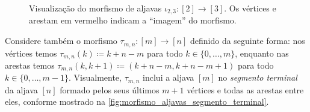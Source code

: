 \begin{figure}[h]
    \centering
    \caption{Visualização do morfismo de aljavas $\iota_{2,3}: [2] \to [3]$. Os vértices e arestam em vermelho indicam a ``imagem'' do morfismo.}
    \label{fig:morfismo_aljavas_segmento_inicial}
\end{figure}

Considere também o morfismo $\tau_{m,n}: [m] \to [n]$ definido da seguinte forma: nos vértices temos $\tau_{m,n}(k) \coloneqq k+n-m$ para todo $k \in \{0,\dots,m\}$, enquanto nas arestas temos $\tau_{m,n}(k,k+1) \coloneqq (k+n-m,k+n-m+1)$ para todo $k \in \{0,\dots,m-1\}$.
Visualmente, $\tau_{m,n}$ inclui a aljava $[m]$ no \emph{segmento terminal} da aljava $[n]$ formado pelos seus últimos $m+1$ vértices e todas as arestas entre eles, conforme mostrado na \cref{fig:morfismo_aljavas_segmento_terminal}.

